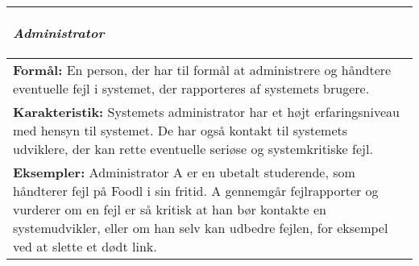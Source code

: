 \begin{tabular}{p{\textwidth}}
    \hline
    \begin{center} \textbf{\textit{Administrator}} \end{center} \\ \hline
    \textbf{Formål:} En person, der har til formål at administrere og håndtere eventuelle fejl i systemet, der rapporteres af systemets brugere. \\
    \textbf{Karakteristik:} Systemets administrator har et højt erfaringsniveau med hensyn til systemet. De har også kontakt til systemets udviklere, der kan rette eventuelle seriøse og systemkritiske fejl. \\
    \textbf{Eksempler:} Administrator A er en ubetalt studerende, som håndterer fejl på Foodl i sin fritid. A gennemgår fejlrapporter og vurderer om en fejl er så kritisk at han bør kontakte en systemudvikler, eller om han selv kan udbedre fejlen, for eksempel ved at slette et dødt link. \\ \hline
\end{tabular}
